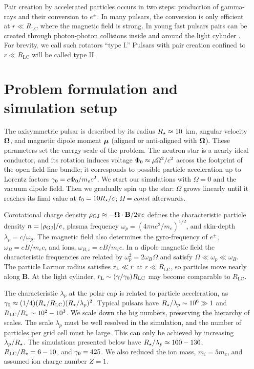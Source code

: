 Pair creation by accelerated particles occurs in two steps: production of gamma-rays
and their conversion to $e^\pm$. In many pulsars, the conversion is only efficient
at $r\ll R_\mathrm{LC}$ where the magnetic field is strong. In young fast pulsars pairs can
be created through photon-photon collisions inside and around
the light cylinder
\citep{cheng_energetic_1986}.
For brevity, we call such rotators
``type I.'' Pulsars with pair creation confined to $r\ll R_\mathrm{LC}$ will be called type II.


\section{Problem formulation and simulation setup}


The axisymmetric pulsar is described by its radius $R_{\star}\approx 10$~km,
angular velocity $\bm{\Omega}$, and magnetic dipole moment $\bm{\mu}$ (aligned or
anti-aligned with $\bm{\Omega}$).  These parameters set the energy scale of
the problem. The neutron star is a nearly ideal conductor, and its
rotation induces voltage $\Phi_0\approx \mu\Omega^2/c^2$ across the
footprint of the open field line bundle;
it corresponds to possible particle acceleration up to Lorentz factors
$\gamma_0=e\Phi_0/m_ec^2$.
We start our simulations with $\Omega=0$ and the vacuum dipole field.
Then we gradually spin up the star: $\Omega$ grows linearly until
it reaches its final value at $t_0=10 R_{\star}/c$;
$\Omega=const$ afterwards.

Corotational charge density
$\rho_{\rm GJ}\approx -\bm{\Omega}\cdot \mathbf{B}/2\pi c$
defines the characteristic particle density $n=|\rho_{\rm GJ}|/e$, plasma
frequency $\omega_p=(4\pi ne^2/m_e)^{1/2}$, and skin-depth
$\lambda_p=c/\omega_p$.  The magnetic field also determines the
gyro-frequency of $e^\pm$, $\omega_B=eB/m_ec$, and ions,
$\omega_{B,i}=eB/m_ic$. In a dipole magnetic field
the characteristic frequencies
are related by $\omega_p^2=2\omega_B\Omega$ and satisfy
$\Omega\ll\omega_p\ll\omega_B$.
The particle Larmor radius satisfies
$r_{\rm L}\ll r$ at $r\ll R_\mathrm{LC}$, so particles move nearly along $\mathbf{B}$. At the light cylinder,
$r_{\rm L}\sim(\gamma/\gamma_0)R_\mathrm{LC}$ may become comparable to $R_\mathrm{LC}$.

The characteristic $\lambda_p$ at the polar cap is related to particle
acceleration, as $\gamma_0\approx (1/4)(R_{\star}/R_\mathrm{LC})(R_{\star}/\lambda_p)^2$.
Typical pulsars have $R_{\star}/\lambda_p\sim 10^6\gg 1$ and $R_\mathrm{LC}/R_{\star}\sim
10^2-10^3$.  We scale down the big numbers, preserving the hierarchy
of scales. The scale $\lambda_p$ must be well resolved in the
simulation, and the number of particles per grid cell must be large.
This can only be achieved by increasing $\lambda_p/R_{\star}$.
The simulations presented below have
$R_{\star}/\lambda_p\approx 100-130$, $R_\mathrm{LC}/R_{\star}=6-10$, and  $\gamma_0=425$.
We also reduced the ion mass, $m_i=5m_e$,
and assumed ion charge number $Z=1$.


